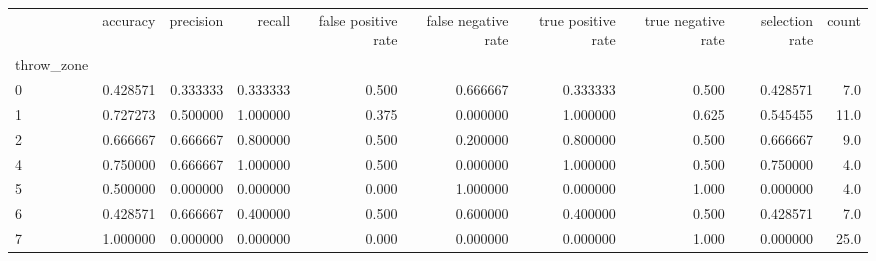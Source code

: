 \begin{tabular}{lrrrrrrrrr}
\toprule
{} &  accuracy &  precision &    recall &  false positive rate &  false negative rate &  true positive rate &  true negative rate &  selection rate &  count \\
throw\_zone &           &            &           &                      &                      &                     &                     &                 &        \\
\midrule
0          &  0.428571 &   0.333333 &  0.333333 &                0.500 &             0.666667 &            0.333333 &               0.500 &        0.428571 &    7.0 \\
1          &  0.727273 &   0.500000 &  1.000000 &                0.375 &             0.000000 &            1.000000 &               0.625 &        0.545455 &   11.0 \\
2          &  0.666667 &   0.666667 &  0.800000 &                0.500 &             0.200000 &            0.800000 &               0.500 &        0.666667 &    9.0 \\
4          &  0.750000 &   0.666667 &  1.000000 &                0.500 &             0.000000 &            1.000000 &               0.500 &        0.750000 &    4.0 \\
5          &  0.500000 &   0.000000 &  0.000000 &                0.000 &             1.000000 &            0.000000 &               1.000 &        0.000000 &    4.0 \\
6          &  0.428571 &   0.666667 &  0.400000 &                0.500 &             0.600000 &            0.400000 &               0.500 &        0.428571 &    7.0 \\
7          &  1.000000 &   0.000000 &  0.000000 &                0.000 &             0.000000 &            0.000000 &               1.000 &        0.000000 &   25.0 \\
\bottomrule
\end{tabular}
